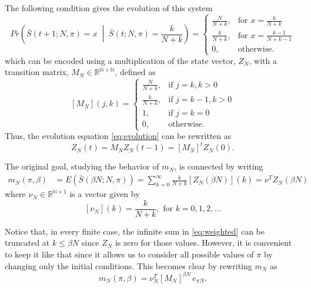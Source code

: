 \documentclass{article}
\newcommand{\N}{\mathbb{N}}
\newcommand{\R}{\mathbb{R}}
\newcommand{\ppar}[1]{\left( #1 \right)}
\newcommand{\spar}[1]{\left[ #1 \right]}
\begin{document}
The following condition gives the evolution of this system
\begin{equation}
    Pr\ppar{\bar{S}(t+1; N, \pi) = x \;\middle|\; \bar{S}(t; N, \pi) = \frac{k}{N+k}} = 
    \begin{cases}
        \frac{N}{N+k}, &\text{for } x= \frac{k}{N+k} \\
        \frac{k}{N+k}, &\text{for } x= \frac{k-1}{N+k-1} \\
        0, &\text{otherwise.}
    \end{cases}
    \label{eq:evolution}
\end{equation}
which can be encoded using a multiplication of the state vector, $Z_N$, with a transition matrix, $M_N\in \R^{\N\times \N}$, defined as
\begin{equation}
    \spar{M_N}(j,k) = 
    \begin{cases}
        \frac{N}{N+k}, &\text{if } j= k, k>0 \\
        \frac{k}{N+k}, &\text{if } j= k-1, k>0 \\
        1, &\text{if } j= k=0 \\
        0, &\text{otherwise.}
    \end{cases}
\end{equation}
Thus, the evolution equation \eqref{eq:evolution} can be rewritten as
\begin{equation}
    Z_N(t) = M_N Z_N(t-1) = \spar{M_N}^t Z_N(0).
\end{equation}

The original goal, studying the behavior of $m_N$, is connected by writing
\begin{align}
    m_N(\pi, \beta) 
    &= 
    E\ppar{\bar{S}\ppar{\beta N; N, \pi }}
    =
    \sum_{k=0}^{\infty} \frac{k}{N+k} \spar{Z_N(\beta N)}(k)
    =
    \nu^T Z_N(\beta N)
    \label{eq:weighted}
\end{align}
where $\nu_N \in \R^{\N \times 1}$ is a vector given by
\begin{equation}
    \spar{\nu_N}(k) = \frac{k}{N+k}, \text{ for } k=0,1, 2, \dots
\end{equation}

Notice that, in every finite case, the infinite sum in \eqref{eq:weighted} can be truncated at $k\leq \beta N$ since $Z_N$ is zero for those values.
%
However, it is convenient to keep it like that since it allows us to consider all possible values of $\pi$ by changing only the initial conditions.
%
This becomes clear by rewriting $m_N$ as
\begin{equation}
    m_N(\pi, \beta) = \nu_N^T \spar{M_N}^{\beta N}\, e_{\pi N}.
    \label{eq:mat_mult_base}
\end{equation}
\end{document}
